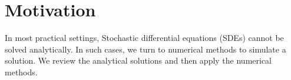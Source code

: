 \section*{Motivation}
In most practical settings, Stochastic differential equations (SDEs) cannot be solved analytically. In such cases, we turn to numerical methods to simulate a solution. We review the analytical solutions and then apply the numerical methods.

